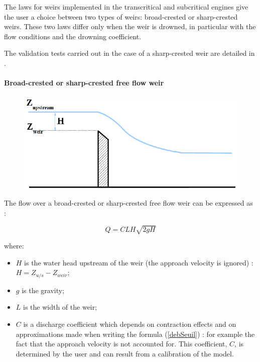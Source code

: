 \vspace{0.5cm}

The laws for weirs implemented in the transcritical and subcritical engines give the user a choice between two types of weirs: broad-crested or sharp-crested weirs. These two laws differ only when the weir is drowned, in particular with the flow conditions and the drowning coefficient.

\vspace{0.5cm}

The validation tests carried out in the case of a sharp-crested weir are detailed in \cite{GOUTAL03}.

\paragraph{Broad-crested or sharp-crested free flow weir\\}

\hspace*{1cm}

\begin{figure}[h]
    \begin{center}
     \includegraphics[scale=1.3]{Figures/Sden.eps}
    \end{center}
\end{figure}

\vspace{0.5cm}

The flow over a broad-crested or sharp-crested free flow weir can be expressed as :

\begin{equation}
 \label{debSeuil}
 Q = C L H \sqrt{2 g H}
\end{equation}

where:

\begin{itemize}
 \item $H$ is the water head upstream of the weir (the approach velocity is ignored) : $H = Z_{u/s} - Z_{weir}$;
 \item $g$ is the gravity;
 \item $L$ is the width of the weir;
 \item $C$ is a discharge coefficient which depends on contraction effects and on approximations made when writing the formula (\ref{debSeuil}) : for example the fact that the approach velocity is not accounted for. This coefficient, $C$, is determined by the user and can result from a calibration of the model.
\end{itemize}

